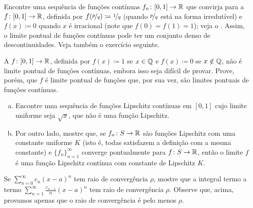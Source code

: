 \begin{exercise}[Desafiador]
Encontre uma sequência de funções contínuas $f_n \colon [0,1] \to {\mathbb{R}}$
que convirja para a  $f \colon [0,1] \to {\mathbb{R}}$,
definida por $f(\nicefrac{p}{q}) \coloneqq \nicefrac{1}{q}$ (quando
$\nicefrac{p}{q}$ está na forma irredutível) e $f(x) \coloneqq 0$ quando
$x$ é irracional (note que $f(0) = f(1) = 1$); veja o
.
Assim, o limite pontual de funções contínuas pode ter um conjunto denso de
descontinuidades. Veja também o exercício seguinte.
\end{exercise}

\begin{exercise}[Desafiador]
A 
$f \colon [0,1] \to {\mathbb{R}}$, definida por $f(x) \coloneqq 1$ se $x \in {\mathbb{Q}}$
e $f(x) \coloneqq 0$ se $x \notin {\mathbb{Q}}$, não é limite pontual de funções
contínuas, embora isso seja difícil de provar.
Prove, porém, que $f$ é limite pontual de funções que, por sua vez, são
limites pontuais de funções contínuas.
\end{exercise}

\begin{exercise}
\leavevmode
\begin{enumerate}[a)]
\item
Encontre uma sequência de funções Lipschitz contínuas em $[0,1]$ cujo
limite uniforme seja $\sqrt{x}$, que não é uma função Lipschitz.
\item
Por outro lado, mostre que, se $f_n \colon S \to {\mathbb{R}}$ são funções Lipschitz
com uma constante uniforme $K$ (isto é, todas satisfazem a definição com
a mesma constante) e $\{ f_n \}_{n=1}^\infty$ converge pontualmente para
$f \colon S \to {\mathbb{R}}$, então o limite $f$ é uma função Lipschitz contínua
com constante de Lipschitz $K$.
\end{enumerate}
\end{exercise}

\begin{exercise}
Se $\sum_{n=0}^\infty c_n {(x-a)}^n$ tem raio de convergência $\rho$,
mostre que a integral termo a termo
$\sum_{n=1}^\infty \frac{c_{n-1}}{n} {(x-a)}^n$ tem raio de convergência
$\rho$. Observe que, acima, provamos apenas que o raio de convergência é
pelo menos $\rho$.
\end{exercise}

